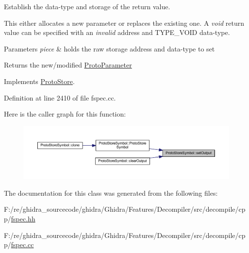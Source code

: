 Establish the data-\/type and storage of the return value. 

This either allocates a new parameter or replaces the existing one. A {\itshape void} return value can be specified with an {\itshape invalid} address and T\+Y\+P\+E\+\_\+\+V\+O\+ID data-\/type. 
\begin{DoxyParams}{Parameters}
{\em piece} & holds the raw storage address and data-\/type to set \\
\hline
\end{DoxyParams}
\begin{DoxyReturn}{Returns}
the new/modified \mbox{\hyperlink{class_proto_parameter}{Proto\+Parameter}} 
\end{DoxyReturn}


Implements \mbox{\hyperlink{class_proto_store_a51a4d28fac8dc3ba5037190ed0cc0edc}{Proto\+Store}}.



Definition at line 2410 of file fspec.\+cc.

Here is the caller graph for this function\+:
\nopagebreak
\begin{figure}[H]
\begin{center}
\leavevmode
\includegraphics[width=350pt]{class_proto_store_symbol_a06c54299b4b14b6b41a26cdcee6d5484_icgraph}
\end{center}
\end{figure}


The documentation for this class was generated from the following files\+:\begin{DoxyCompactItemize}
\item 
F\+:/re/ghidra\+\_\+sourcecode/ghidra/\+Ghidra/\+Features/\+Decompiler/src/decompile/cpp/\mbox{\hyperlink{fspec_8hh}{fspec.\+hh}}\item 
F\+:/re/ghidra\+\_\+sourcecode/ghidra/\+Ghidra/\+Features/\+Decompiler/src/decompile/cpp/\mbox{\hyperlink{fspec_8cc}{fspec.\+cc}}\end{DoxyCompactItemize}
